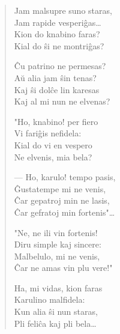 \begin{verse}
                        Jam malsupre suno staras,\\
                        Jam rapide vesperi\^gas\dots\\
                        Kion do knabino faras?\\
                        Kial do \^si ne montri\^gas?

                        \^Cu patrino ne permesas?\\
                        A\u u alia jam \^sin tenas?\\
                        Kaj \^si dol\^ce lin karesas\\
                        Kaj al mi nun ne elvenas?

                        "Ho, knabino! per fiero\\
                        Vi fari\^gis nefidela:\\
                        Kial do vi en vespero\\
                        Ne elvenis, mia bela?

                        --- Ho, karulo! tempo pasis,\\
                        \^Gustatempe mi ne venis,\\
                        \^Car gepatroj min ne lasis,\\
                        \^Car gefratoj min fortenis"\dots

                        "Ne, ne ili vin fortenis!\\
                        Diru simple kaj sincere:\\
                        Malbelulo, mi ne venis,\\
                        \^Car ne amas vin plu vere!"

                        Ha, mi vidas, kion faras\\
                        Karulino malfidela:\\
                        Kun alia \^si nun staras,\\
                        Pli feli\^ca kaj pli bela\dots

\end{verse}

\smallrule{}